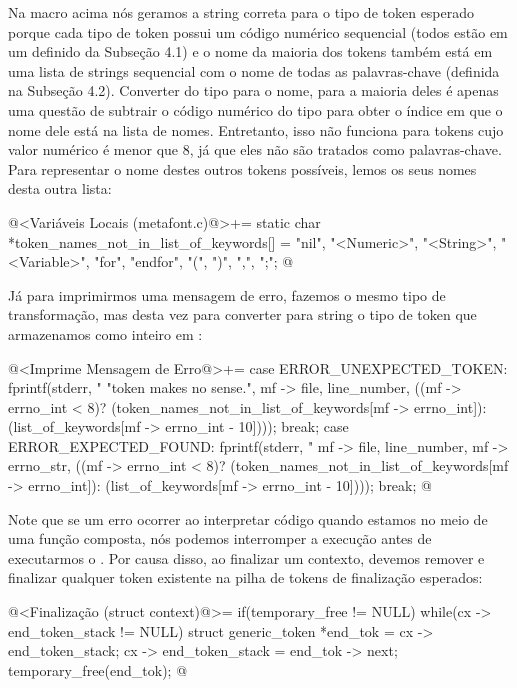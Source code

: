 Na macro acima nós geramos a string correta para o tipo de token
esperado porque cada tipo de token possui um código numérico
sequencial (todos estão em um  definido da Subseção
4.1) e o nome da maioria dos tokens também está em uma lista de
strings sequencial com o nome de todas as palavras-chave (definida na
Subseção 4.2). Converter do tipo para o nome, para a maioria deles é
apenas uma questão de subtrair o código numérico do tipo para obter o
índice em que o nome dele está na lista de nomes. Entretanto, isso não
funciona para tokens cujo valor numérico é menor que 8, já que eles
não são tratados como palavras-chave. Para representar o nome destes
outros tokens possíveis, lemos os seus nomes desta outra lista:

\iniciocodigo
@<Variáveis Locais (metafont.c)@>+=
static char *token_names_not_in_list_of_keywords[] = {
  "nil", "<Numeric>", "<String>", "<Variable>", "for", "endfor", "(", ")",
  ",", ";"};
@
\fimcodigo

Já para imprimirmos uma mensagem de erro, fazemos o mesmo tipo de
transformação, mas desta vez para converter para string o tipo de
token que armazenamos como inteiro em :

\iniciocodigo
@<Imprime Mensagem de Erro@>+=
case ERROR_UNEXPECTED_TOKEN:
  fprintf(stderr, "%
          "token makes no sense.", mf -> file, line_number,
          ((mf -> errno_int < 8)?
          (token_names_not_in_list_of_keywords[mf -> errno_int]):
          (list_of_keywords[mf -> errno_int - 10])));
  break;
case ERROR_EXPECTED_FOUND:
  fprintf(stderr, "%
          mf -> file, line_number, mf -> errno_str,
          ((mf -> errno_int < 8)?
          (token_names_not_in_list_of_keywords[mf -> errno_int]):
          (list_of_keywords[mf -> errno_int - 10])));
  break;
@
\fimcodigo

Note que se um erro ocorrer ao interpretar código quando estamos no
meio de uma função composta, nós podemos interromper a execução antes
de executarmos o . Por causa disso, ao
finalizar um contexto, devemos remover e finalizar qualquer token
existente na pilha de tokens de finalização esperados:

\iniciocodigo
@<Finalização (struct context)@>=
if(temporary_free != NULL){
  while(cx -> end_token_stack != NULL){
    struct generic_token *end_tok = cx -> end_token_stack;
    cx -> end_token_stack = end_tok -> next;
    temporary_free(end_tok);
  }  
}
@
\fimcodigo

